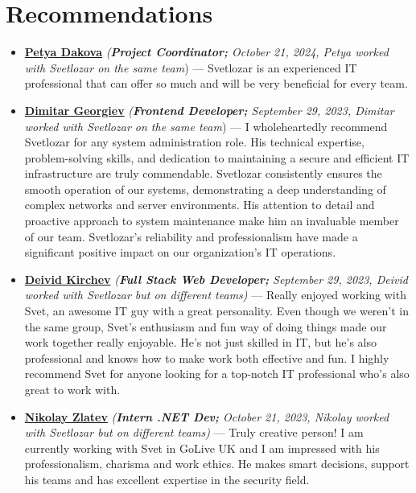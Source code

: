 \documentclass[letterpaper, 10pt]{article}
\begin{document}
	\section*{Recommendations}
\begin{itemize}
	
		\item \textbf{\href{https://www.linkedin.com/in/petya-dakova-3b37162a2/}{Petya Dakova}} \textit{(\textbf{Project Coordinator;} October 21, 2024, Petya worked with Svetlozar on the same team}) — Svetlozar is an experienced IT professional that can offer so much and will be very beneficial for every team. \\
	
	\item \textbf{\href{https://www.linkedin.com/in/dimitar-georgiev-29a6ab144/}{Dimitar
			Georgiev}} \textit{(\textbf{Frontend Developer;} September 29, 2023, Dimitar worked with Svetlozar on the same team}) — I wholeheartedly recommend Svetlozar for any system
	administration role. His technical expertise, problem-solving skills, and dedication
	to maintaining a secure and efficient IT infrastructure are truly commendable.
	Svetlozar consistently ensures the smooth operation of our systems, demonstrating
	a deep understanding of complex networks and server environments. His
	attention to detail and proactive approach to system maintenance make him
	an invaluable member of our team. Svetlozar’s reliability and professionalism
	have made a significant positive impact on our organization’s IT operations.\\
	
	\item \textbf{\href{https://www.linkedin.com/in/deivid-kirchev-00378b252/}{Deivid
			Kirchev}} \textit{(\textbf{Full Stack Web Developer;} September 29, 2023, Deivid worked with Svetlozar but on different teams)} — Really enjoyed working with Svet, an awesome IT guy with a great
	personality. Even though we weren’t in the same group, Svet’s enthusiasm and
	fun way of doing things made our work together really enjoyable. He’s not
	just skilled in IT, but he’s also professional and knows how to make work both
	effective and fun. I highly recommend Svet for anyone looking for a top-notch
	IT professional who’s also great to work with.\\
	
	\item \textbf{\href{https://www.linkedin.com/in/nikolay-zlatev/}{Nikolay
			Zlatev}} \textit{(\textbf{Intern .NET Dev;} October 21, 2023, Nikolay worked with Svetlozar but on different teams)} — Truly creative person! I am currently working with Svet in GoLive
	UK and I am impressed with his professionalism, charisma and work ethics. He
	makes smart decisions, support his teams and has excellent expertise in
	the security field.
	

\end{itemize}
\end{document}
